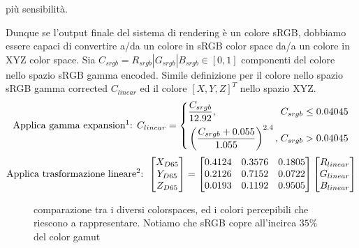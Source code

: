 pi\`u sensibilit\`a.\par
Dunque se l'output finale del sistema di rendering \`e un colore sRGB, dobbiamo essere capaci di convertire a/da un colore in sRGB color space da/a un
colore in XYZ color space. Sia $C_{srgb} = R_{srgb}|G_{srgb}|B_{srgb} \in [0,1]$ componenti del colore nello spazio sRGB gamma encoded. Simile
definizione per il colore nello spazio sRGB gamma corrected $C_{linear}$ ed il colore $[X, Y, Z]^T$ nello spazio XYZ.
\begin{equation}\label{chapter2:colorimetry:sRGB2XYZ}
	\text{Applica gamma expansion\footnotemark{}: }C_{linear} = \left\{\begin{alignedat}{2}
		&\frac{C_{srgb}}{12.92}, &C_{srgb}\leq 0.04045\\
		&\left(\frac{C_{srgb}+0.055}{1.055}\right)^{2.4},\;&C_{srgb}> 0.04045
	\end{alignedat}\right.
\end{equation}
\begin{equation}
	\text{Applica trasformazione lineare\footnotemark{}: }\begin{bmatrix}
		X_{D65}\\ Y_{D65}\\ Z_{D65}
	\end{bmatrix}=
	\begin{bmatrix}
		0.4124 & 0.3576 & 0.1805 \\
		0.2126 & 0.7152 & 0.0722 \\
		0.0193 & 0.1192 & 0.9505 
	\end{bmatrix}
	\begin{bmatrix}
		R_{linear} \\ G_{linear} \\ B_{linear}
	\end{bmatrix}
\end{equation}
\begin{figure}[tb]
	\label{chapter2:colorimetry:gamut}
	
	\caption{comparazione tra i diversi colorspaces, ed i colori percepibili che riescono a rappresentare. Notiamo che sRGB copre all'incirca $35\%$
	del color gamut}
\end{figure}
